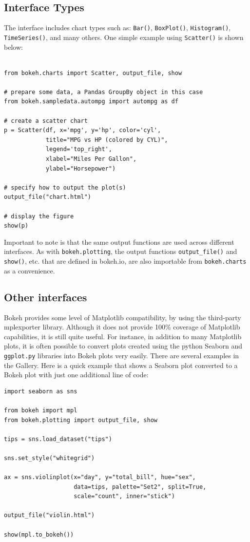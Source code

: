 \documentclass[a4paper,12pt]{article}
\begin{document}
\subsection*{Interface Types}
The interface includes chart types such as: \texttt{Bar()}, \texttt{BoxPlot()}, \texttt{Histogram()}, \texttt{TimeSeries()}, and many others. One simple example using \texttt{Scatter()} is shown below:
\begin{framed}
	\begin{verbatim}
	
from bokeh.charts import Scatter, output_file, show

# prepare some data, a Pandas GroupBy object in this case
from bokeh.sampledata.autompg import autompg as df

# create a scatter chart
p = Scatter(df, x='mpg', y='hp', color='cyl',
            title="MPG vs HP (colored by CYL)",
            legend='top_right',
            xlabel="Miles Per Gallon",
            ylabel="Horsepower")

# specify how to output the plot(s)
output_file("chart.html")

# display the figure
show(p)
\end{verbatim}
\end{framed}
Important to note is that the same output functions are used across different interfaces. As with \texttt{bokeh.plotting}, the output functions \texttt{output\_file()} and \texttt{show()}, etc. that are defined in bokeh.io, are also importable from \texttt{bokeh.charts} as a convenience.

\subsection*{Other interfaces}
Bokeh provides some level of Matplotlib compatibility, by using the third-party mplexporter library. Although it does not provide 100\% coverage of Matplotlib capabilities, it is still quite useful. For instance, in addition to many Matplotlib plots, it is often possible to convert plots created using the python Seaborn and \texttt{ggplot.py} libraries into Bokeh plots very easily. There are several examples in the Gallery. Here is a quick example that shows a Seaborn plot converted to a Bokeh plot with just one additional line of code:

\begin{framed}
	\begin{verbatim}
import seaborn as sns

from bokeh import mpl
from bokeh.plotting import output_file, show

tips = sns.load_dataset("tips")

sns.set_style("whitegrid")

ax = sns.violinplot(x="day", y="total_bill", hue="sex",
                    data=tips, palette="Set2", split=True,
                    scale="count", inner="stick")

output_file("violin.html")

show(mpl.to_bokeh())
	
\end{verbatim}
\end{framed}
\end{document}
